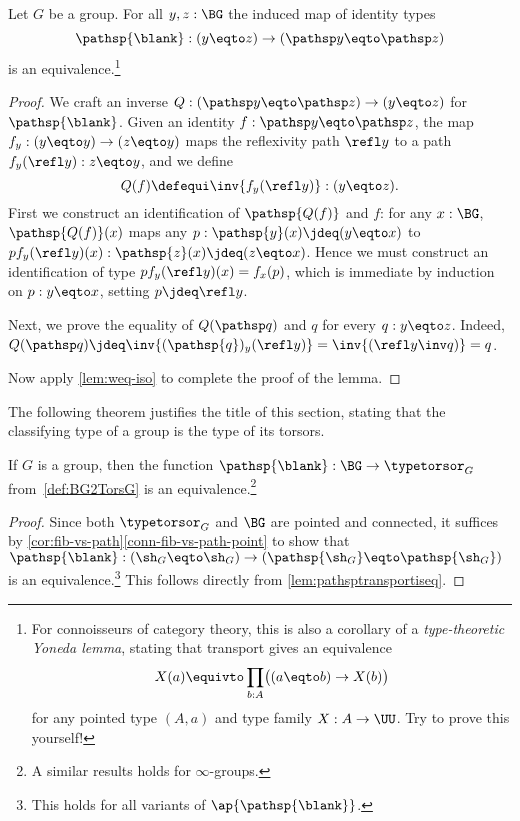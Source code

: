 \begin{lemma}\label{lem:pathsptransportiseq}
  Let $G$ be a group. For all $y,z:\BG$ the induced map of identity types
  \[
    \pathsp{\blank}:(y\eqto z)\to (\pathsp y\eqto \pathsp z)
  \]
  is an equivalence.\footnote{%
    For connoisseurs of category theory,
    this is also a corollary of a \emph{type-theoretic Yoneda lemma},
    stating that transport gives an equivalence
    \[
      X(a) \equivto \prod_{b:A}\bigl((a \eqto b) \to X(b)\bigr)
    \]
    for any pointed type $(A,a)$ and type family $X: A \to \UU$.
    Try to prove this yourself!}
\end{lemma}
\begin{proof}
  We craft an inverse $Q:(\pathsp y\eqto \pathsp z) \to (y\eqto z)$ for
  $\pathsp{\blank}$. Given an identity $f:\pathsp y \eqto \pathsp z$, the map
  $f_y: (y\eqto y) \to (z\eqto y)$ maps the reflexivity path $\refl y$ to a path
  $f_y(\refl y):z\eqto y$, and we define
  \[
    Q(f) \defequi \inv{f_y(\refl y)} : (y\eqto z).
  \]
  First we construct an identification of $\pathsp {Q(f)}$ and $f$:
  for any $x:\BG$, 
  $\pathsp {Q(f)}(x)$ maps any $p:\pathsp{y}(x)\jdeq(y\eqto x)$ to
  $p f_y(\refl y)(x):\pathsp{z}(x)\jdeq(z\eqto x)$. Hence we must
  construct an identification of type $p f_y(\refl y)(x)=f_x(p)$,
  which is immediate by induction on $p:y\eqto x$, setting $p\jdeq \refl y$.
  
  Next, we prove the equality of $Q(\pathsp q)$ and $q$
  for every $q:y\eqto z$. Indeed, 
  $Q(\pathsp q)\jdeq\inv{(\pathsp{q})_y(\refl y)} = \inv{(\refl y \inv q)} = q$.
  
  Now apply \cref{lem:weq-iso} to complete the proof of the lemma.
\end{proof}

The following theorem justifies the title of this section, stating 
that the classifying type of a group is the type of its torsors.

\begin{theorem}\label{lem:BGbytorsor}
  If $G$ is a group, then the function
  $\pathsp{\blank}:\BG\to\typetorsor_G$ from~\cref{def:BG2TorsG}
  is an equivalence.\footnote{A similar results holds for $\infty$-groups.}
\end{theorem}

\begin{proof}
  Since both $\typetorsor_G$ and $\BG$ are pointed and connected,
  it suffices by
  \cref{cor:fib-vs-path}\ref{conn-fib-vs-path-point} to show that 
  $\pathsp{\blank}:(\sh_G\eqto\sh_G)\to(\pathsp{\sh_G}\eqto \pathsp{\sh_G})$
  is an equivalence.\footnote{%
  This holds for all variants of $\ap{\pathsp{\blank}}$.}
  This follows directly from \cref{lem:pathsptransportiseq}.
\end{proof}

